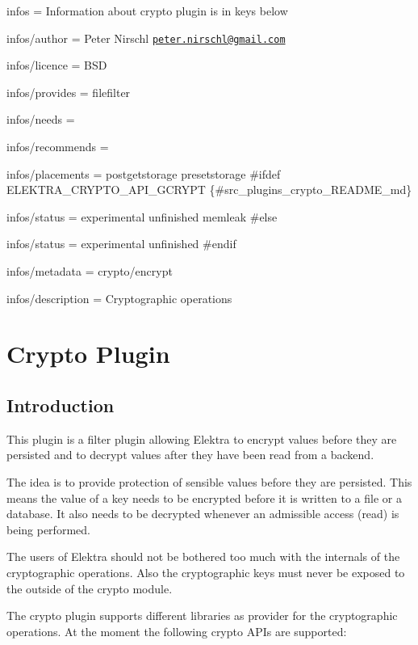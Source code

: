 
\begin{DoxyItemize}
\item infos = Information about crypto plugin is in keys below
\item infos/author = Peter Nirschl \href{mailto:peter.nirschl@gmail.com}{\tt peter.\+nirschl@gmail.\+com}
\item infos/licence = B\+S\+D
\item infos/provides = filefilter
\item infos/needs =
\item infos/recommends =
\item infos/placements = postgetstorage presetstorage \#ifdef E\+L\+E\+K\+T\+R\+A\+\_\+\+C\+R\+Y\+P\+T\+O\+\_\+\+A\+P\+I\+\_\+\+G\+C\+R\+Y\+P\+T \{\#src\+\_\+plugins\+\_\+crypto\+\_\+\+R\+E\+A\+D\+M\+E\+\_\+md\}
\item infos/status = experimental unfinished memleak \#else
\item infos/status = experimental unfinished \#endif
\item infos/metadata = crypto/encrypt
\item infos/description = Cryptographic operations
\end{DoxyItemize}

\section*{Crypto Plugin}

\subsection*{Introduction}

This plugin is a filter plugin allowing Elektra to encrypt values before they are persisted and to decrypt values after they have been read from a backend.

The idea is to provide protection of sensible values before they are persisted. This means the value of a key needs to be encrypted before it is written to a file or a database. It also needs to be decrypted whenever an admissible access (read) is being performed.

The users of Elektra should not be bothered too much with the internals of the cryptographic operations. Also the cryptographic keys must never be exposed to the outside of the crypto module.

The crypto plugin supports different libraries as provider for the cryptographic operations. At the moment the following crypto A\+P\+Is are supported\+:


